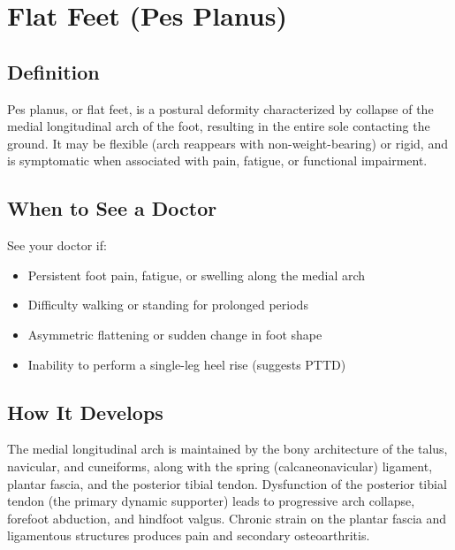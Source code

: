 \chapter{Flat Feet (Pes Planus)}

\section*{Definition}
Pes planus, or flat feet, is a postural deformity characterized by collapse of the medial longitudinal arch of the foot, resulting in the entire sole contacting the ground. It may be flexible (arch reappears with non-weight-bearing) or rigid, and is symptomatic when associated with pain, fatigue, or functional impairment.

\section*{When to See a Doctor}
See your doctor if:
\begin{itemize}
  \item Persistent foot pain, fatigue, or swelling along the medial arch
  \item Difficulty walking or standing for prolonged periods
  \item Asymmetric flattening or sudden change in foot shape
  \item Inability to perform a single-leg heel rise (suggests PTTD)
\end{itemize}

\section*{How It Develops}
The medial longitudinal arch is maintained by the bony architecture of the talus, navicular, and cuneiforms, along with the spring (calcaneonavicular) ligament, plantar fascia, and the posterior tibial tendon. Dysfunction of the posterior tibial tendon (the primary dynamic supporter) leads to progressive arch collapse, forefoot abduction, and hindfoot valgus. Chronic strain on the plantar fascia and ligamentous structures produces pain and secondary osteoarthritis.

